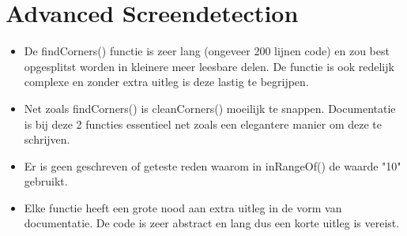 \documentclass[a4paper,11pt]{article}
\begin{document}
\section{Advanced Screendetection}

\begin{itemize}
\item De findCorners() functie is zeer lang (ongeveer 200 lijnen code) en zou best opgesplitst worden in kleinere meer leesbare delen. De functie is ook redelijk complexe en zonder extra uitleg is deze lastig te begrijpen.
\item Net zoals findCorners() is cleanCorners() moeilijk te snappen. Documentatie is bij deze 2 functies essentieel net zoals een elegantere manier om deze te schrijven.
\item Er is geen geschreven of geteste reden waarom in inRangeOf() de waarde "10" gebruikt.
\item Elke functie heeft een grote nood aan extra uitleg in de vorm van documentatie. De code is zeer abstract en lang dus een korte uitleg is vereist.
\end{itemize}
\end{document}
